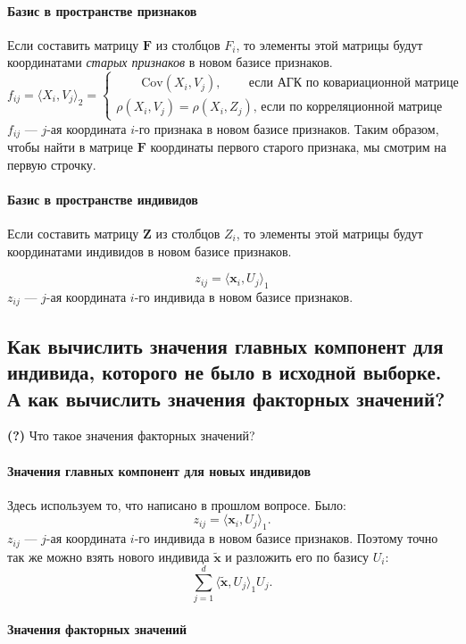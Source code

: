 \documentclass[12pt,a4paper,final]{article}
\begin{document}
\paragraph{Базис в пространстве признаков}

Если составить матрицу $\bm F$ из столбцов $F_i$, то элементы этой матрицы будут координатами \textit{старых признаков} в новом базисе признаков.
$$
f_{ij} = \langle X_i, V_j \rangle _2 = \begin{cases} \qquad \mathrm{Cov}(X_i, V_j),\,\qquad \textit{если АГК по ковариационной матрице} \\  \rho(X_i, V_j) = \rho(X_i, Z_j),\, \textit{если по корреляционной матрице} \end{cases}
$$
$f_{ij}$ --- $j$-ая координата $i$-го признака в новом базисе признаков.
Таким образом, чтобы найти в матрице $\bm F$ координаты первого старого признака, мы смотрим на первую строчку.

\paragraph{Базис в пространстве индивидов}

Если составить матрицу $\bm Z$ из столбцов $Z_i$, то элементы этой матрицы будут координатами индивидов в новом базисе признаков.

$$
z_{ij} = \langle \bm x_i, U_j \rangle _1
$$
$z_{ij}$ --- $j$-ая координата $i$-го индивида в новом базисе признаков.

\subsection{Как вычислить значения главных компонент для индивида, которого не было в исходной выборке. А как вычислить значения факторных значений?}
\textbf{(?)} Что такое значения факторных значений?

\paragraph{Значения главных компонент для новых индивидов}
Здесь используем то, что написано в прошлом вопросе. Было:
$$
z_{ij} = \langle \bm x_i, U_j \rangle _1.
$$
$z_{ij}$ --- $j$-ая координата $i$-го индивида в новом базисе признаков. Поэтому точно так же можно взять нового индивида $\tilde{\bm{x}}$ и разложить его по базису ${U_i}$: 
$$
\sum_{j = 1}^d \langle \widetilde{\bm{x}}, U_j \rangle _1 U_j.
$$

\paragraph{Значения факторных значений}
\end{document}
